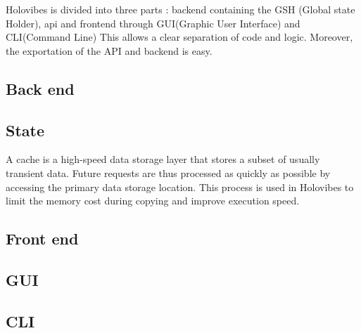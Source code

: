Holovibes is divided into three parts : backend containing the GSH (Global state Holder), api and frontend through GUI(Graphic User Interface) and CLI(Command Line)
This allows a clear separation of code and logic. Moreover, the exportation of the API and backend is easy.

\subsection{Back end}
\subsection{State}
A cache is a high-speed data storage layer that stores a  subset of usually transient data. Future requests are thus processed as quickly as possible by accessing the primary data storage location. This process is used in Holovibes to limit the memory cost during copying and improve execution speed.
\subsection{Front end}
\subsection{GUI}
\subsection{CLI}

